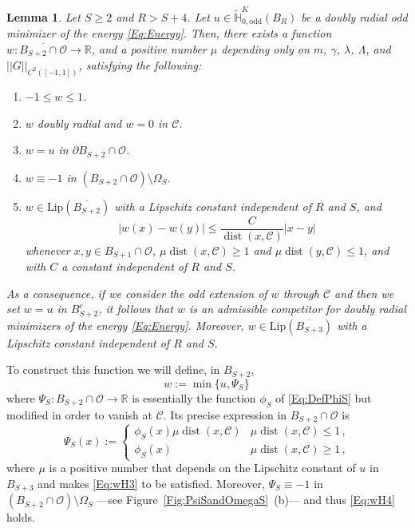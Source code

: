 \documentclass[12pt,reqno]{amsart}
\newtheorem{lemma}[theorem]{Lemma}
\theoremstyle{definition}
\theoremstyle{remark}
\newcommand{\con}[1]{\mathbb{#1}}
\newcommand{\R}{\con{R}} %
\renewcommand{\H}{\con{H}}
\newcommand{\ccal}{\mathscr{C}}
\newcommand{\ocal}{\mathcal{O}}
\newcommand{\norm}[1]{\left | \left |{#1} \right | \right |}
\newcommand{\s}{\gamma}
\newcommand{\Lip}{\mathrm{Lip}}
\DeclareMathOperator{\dist}{dist}
\numberwithin{equation}{section}
\begin{document}
\begin{lemma}
	\label{Lemma:ExistenceCompetitor}
	Let $S\geq 2$ and $R > S + 4$. Let $u\in \widetilde{\H}^K_{0, \mathrm{odd}}(B_R)$ be a doubly radial odd minimizer of the energy \eqref{Eq:Energy}. Then, there exists  a function $w:\overline{ B_{S+2}\cap \ocal} \to \R$, and a positive number $\mu$ depending only on $m$, $\s$, $\lambda$, $\Lambda$, and $\norm{G}_{C^2([-1,1])}$, satisfying the following:
	
	\begin{enumerate}[label={\normalfont (\textcolor{red}{H\arabic*})}, ref=H\arabic*]
		\item
		\label{Eq:wH1} $-1 \leq w \leq 1$.
		\item
		\label{Eq:wH2} $w$ doubly radial and $w=0$ in $\ccal$.
		\item
		\label{Eq:wH3} $w=u$ in $\partial B_{S+2} \cap \ocal$.
		\item
		\label{Eq:wH4} $w\equiv-1$ in $(B_{S+2}\cap \ocal)\setminus \Omega_S$.
		\item
		\label{Eq:wH5} $w\in \Lip(\overline{B_{S+2}})$ with a Lipschitz constant independent of $R$ and $S$, and
		$$ |w(x)-w(y)| \leq \frac{C}{\dist(x,\ccal)}|x-y| $$
		whenever $x,y \in B_{S+1}\cap \ocal$, $\mu \dist(x,\ccal)\geq 1$ and $\mu \dist(y,\ccal)\leq 1$, and with $C$ a constant independent of $R$ and $S$.
	\end{enumerate} 
	
	As a consequence, if we consider the odd extension of $w$ through $\ccal$ and then we set $w=u$ in $B_{S+2}^c$, it follows that $w$ is an admissible competitor for doubly radial minimizers of the energy \eqref{Eq:Energy}. Moreover, $w\in \Lip(\overline{B_{S+3}})$ with a Lipschitz constant independent of $R$ and $S$.
\end{lemma}


To construct this function we will define, in $B_{S+2}$,
$$
w:= \min \{u, \Psi_S\}\,
$$
where $\Psi_S:B_{S+2} \cap \ocal \to \R$ is essentially the function $\phi_S$ of \eqref{Eq:DefPhiS} but modified in order to vanish at $\ccal$. Its precise expression in $B_{S+2}\cap \ocal$ is
\begin{equation}
\label{Eq:DefPsiS}
\Psi_S(x) :=
\begin{cases}
\phi_S (x) \mu\dist(x,\ccal) &  \mu\dist(x,\ccal) \leq 1 \,, \\
\phi_S (x) &  \mu\dist(x,\ccal) \geq 1\,,
\end{cases}
\end{equation}
where $\mu$ is a positive number that depends on the Lipschitz constant of $u$ in $B_{S+3}$ and makes \eqref{Eq:wH3} to be satisfied. Moreover, $\Psi_S \equiv -1$ in $(B_{S+2}\cap \ocal)\setminus \Omega_S$ ---see Figure~\ref{Fig:PsiSandOmegaS}~(b)--- and thus \eqref{Eq:wH4} holds.
\end{document}
